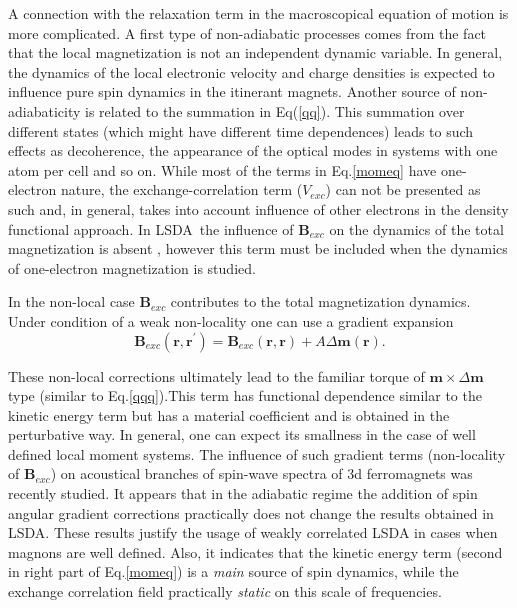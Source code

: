 \documentclass[aps,preprint,twocolumn,10pt]{revtex4}%
\begin{document}
A connection with the relaxation term in the macroscopical equation of motion
is more complicated. A first type of non-adiabatic processes comes from the
fact that the local magnetization is not an independent dynamic variable. In
general, the dynamics of the local electronic velocity and charge densities is
expected to influence pure spin dynamics in the itinerant magnets. Another
source of non-adiabaticity is related to the summation in Eq(\ref{qq}). This
summation over different states (which might have different time dependences)
leads to such effects as decoherence, the appearance of the optical modes in
systems with one atom per cell and so on. While most of the terms in
Eq.\ref{momeq} have one-electron nature, the exchange-correlation term
($V_{exc}$) can not be presented as such and, in general, takes into account
influence of other electrons in the density functional approach. In LSDA\ the
influence of $\mathbf{B}_{exc}$ on the dynamics of the total magnetization is
absent \cite{REV}, however this term must be included when the dynamics of
one-electron magnetization is studied.

In the non-local case $\mathbf{B}_{exc}$ contributes to the total
magnetization dynamics. Under condition of a weak non-locality one can use a
gradient expansion%
\begin{equation}
\mathbf{B}_{exc}\left(  \mathbf{r},\mathbf{r}^{\prime}\right)  =\mathbf{B}%
_{exc}\left(  \mathbf{r},\mathbf{r}\right)  +A\Delta\mathbf{m}\left(
\mathbf{r}\right)  . \label{e1}%
\end{equation}


These non-local corrections ultimately lead to the familiar torque of
$\mathbf{m}\times\Delta\mathbf{m}$ type (similar to Eq.\ref{qqq}).This term
has functional dependence similar to the kinetic energy term but has a
material coefficient and is obtained in the perturbative way. In general, one
can expect its smallness in the case of well defined local moment systems. The
influence of such gradient terms (non-locality of $\mathbf{B}_{exc}$) on
acoustical branches of spin-wave spectra of 3d ferromagnets was recently
studied\cite{SAGA}. It appears that in the adiabatic regime the addition of
spin angular gradient corrections practically does not change the results
obtained in LSDA. These results justify the usage of weakly correlated LSDA in
cases when magnons are well defined. Also, it indicates that the kinetic
energy term (second in right part of Eq.\ref{momeq}) is a \textit{main} source
of spin dynamics, while the exchange correlation field practically
\textit{static} on this scale of frequencies.
\end{document}
